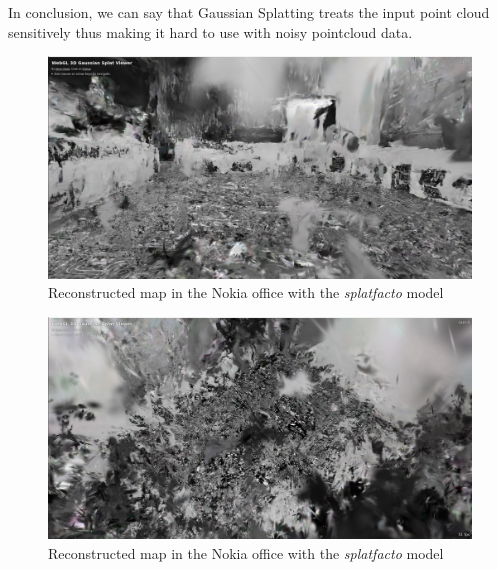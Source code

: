In conclusion, we can say that Gaussian Splatting treats the input point cloud sensitively thus making it hard to use with noisy pointcloud data.

\begin{figure}[htbp]
	\centering
	\includegraphics[width=150mm, keepaspectratio]{figures_jpg/nokia_splatfacto_ours1.jpg}
	\caption{Reconstructed map in the Nokia office with the \textit{splatfacto} model}
	\label{fig:nokia_splatfacto_ours_1}
\end{figure}

\begin{figure}[htbp]
	\centering
	\includegraphics[width=150mm, keepaspectratio]{figures_jpg/nokia_splatfacto_ours2.jpg}
	\caption{Reconstructed map in the Nokia office with the \textit{splatfacto} model}
	\label{fig:nokia_splatfacto_ours_2}
\end{figure}

